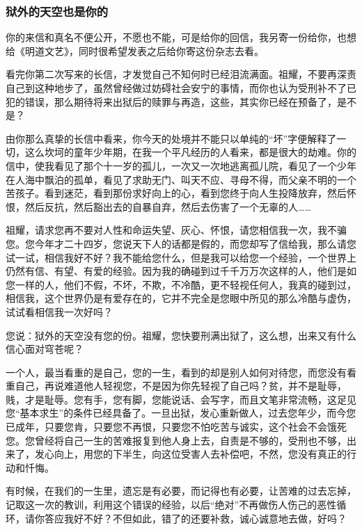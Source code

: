 \subsubsection{狱外的天空也是你的}

\par {}
\par 你的来信和真名不便公开，不愿也不能，可是给你的回信，我另寄一份给你，也想给《明道文艺》，同时很希望发表之后给你寄这份杂志去看。
\par 看完你第二次写来的长信，才发觉自己不知何时已经泪流满面。祖耀，不要再深责自己到这种地步了，虽然曾经做过妨碍社会安宁的事情，而你也认为受刑补不了已犯的错误，那么期待将来出狱后的赎罪与再造，这些，其实你已经在预备了，是不是？
\par 由你那么真挚的长信中看来，你今天的处境并不能只以单纯的“坏”字便解释了一切，这么坎坷的童年少年期，在我一个平凡经历的人看来，都是很大的劫难。你的信中，使我看见了那个十一岁的孤儿，一次又一次地逃离孤儿院，看见了一个少年在人海中飘泊的孤单，看见了求助无门、叫天不应、寻母不得，而父亲不明的一个苦孩子。看到迷茫，看到那份求好向上的心，看到您终于向人生投降放弃，然后怀恨，然后反抗，然后豁出去的自暴自弃，然后去伤害了一个无辜的人……
\par 祖耀，请求您再不要对人性和命运失望、灰心、怀恨，请您相信我一次，我不骗您。您今年才二十四岁，您说天下人的话都是假的，而您却写了信给我，那么请您试一试，相信我好不好？我不能给您什么，但是我可以给您一个经验，一个世界上仍然有信、有望、有爱的经验。因为我的确碰到过千千万万次这样的人，他们是如您一样的人，他们不假，不坏，不欺，不冷酷，更不轻视任何人，我真的碰到过，相信我，这个世界仍是有爱存在的，它并不完全是您眼中所见的那么冷酷与虚伪，试试看相信我一次好吗？
\par 您说：狱外的天空没有您的份。祖耀，您快要刑满出狱了，这么想，出来又有什么信心面对穹苍呢？
\par 一个人，最当看重的是自己，您的一生，看到的却是别人如何对待您，而您没有看重自己，再说难道他人轻视您，不是因为你先轻视了自己吗？贫，并不是耻辱，贱，才是耻辱。您有手，您有脚，您能说话、会写字，而且文笔非常流畅，这足见您“基本求生”的条件已经具备了。一旦出狱，发心重新做人，过去您年少，而今您已成年，只要您肯，只要您不再恨，只要您不怕吃苦与诚实，这个社会不会饿死您。您曾经将自己一生的苦难报复到他人身上去，自责是不够的，受刑也不够，出来了，发心向上，用您的下半生，向这位受害人去补偿吧，不然，您没有真正的行动和忏悔。
\par 有时候，在我们的一生里，遗忘是有必要，而记得也有必要，让苦难的过去忘掉，记取这一次的教训，利用这个错误的经验，以后“绝对”不再做伤人伤己的恶性循环，请你答应我好不好？不但如此，错了的还要补救，诚心诚意地去做，好吗？
